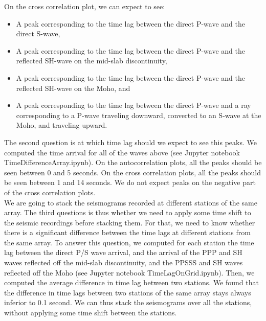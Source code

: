 \documentclass[workdone.tex]{subfiles}
\begin{document}
On the cross correlation plot, we can expect to see:
\begin{itemize}
\item A peak corresponding to the time lag between the direct P-wave and the direct S-wave,
\item A peak corresponding to the time lag between the direct P-wave and the reflected SH-wave on the mid-slab discontinuity,
\item A peak corresponding to the time lag between the direct P-wave and the reflected SH-wave on the Moho, and
\item A peak corresponding to the time lag between the direct P-wave and a ray corresponding to a P-wave traveling downward, converted to an S-wave at the Moho, and traveling upward.
\end{itemize}

The second question is at which time lag should we expect to see this peaks. We computed the time arrival for all of the waves above (see Jupyter notebook TimeDifferenceArray.ipynb). On the autocorrelation plots, all the peaks should be seen between 0 and 5 seconds. On the cross correlation plots, all the peaks should be seen between 1 and 14 seconds. We do not expect peaks on the negative part of the cross correlation plots. \\

We are going to stack the seismograms recorded at different stations of the same array. The third questions is thus whether we need to apply some time shift to the seismic recordings before stacking them. For that, we need to know whether there is a significant difference between the time lags at different stations from the same array. To answer this question, we computed for each station the time lag between the direct P/S wave arrival, and the arrival of the PPP and SH waves reflected off the mid-slab discontinuity, and the PPSSS and SH waves reflected off the Moho (see Jupyter notebook TimeLagOnGrid.ipynb). Then, we computed the average difference in time lag between two stations. We found that the difference in time lags between two stations of the same array stays always inferior to 0.1 second. We can thus stack the seismograms over all the stations, without applying some time shift between the stations. \\
\end{document}
